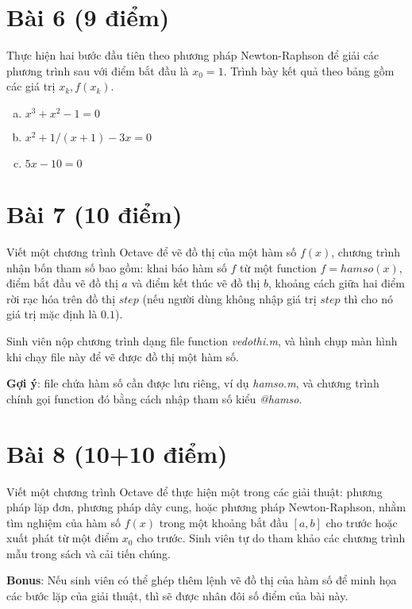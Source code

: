\documentclass[12pt]{article}
\begin{document}
\section{Bài 6 (9 điểm)}
Thực hiện hai bước đầu tiên theo phương pháp Newton-Raphson để giải các phương trình sau với điểm bắt đầu là $x_0 = 1$. Trình bày kết quả theo bảng gồm các giá trị $x_k, f(x_k)$.

\begin{enumerate}[a)]

\item $x^3 + x^2 - 1 = 0$

\item $x^2 + 1/(x+1) - 3x = 0$

\item $5x - 10 = 0$

\end{enumerate}

\section{Bài 7 (10 điểm)}
Viết một chương trình Octave để vẽ đồ thị của một hàm số $f(x)$, chương trình nhận bốn tham số bao gồm: khai báo hàm số $f$ từ một function $f=hamso(x)$, điểm bắt đầu vẽ đồ thị $a$ và điểm kết thúc vẽ đồ thị $b$, khoảng cách giữa hai điểm rời rạc hóa trên đồ thị $step$ (nếu người dùng không nhập giá trị $step$ thì cho nó giá trị mặc định là $0.1$).

Sinh viên nộp chương trình dạng file function \emph{vedothi.m}, và hình chụp màn hình khi chạy file này để vẽ được đồ thị một hàm số.

\textbf{Gợi ý}: file chứa hàm số cần được lưu riêng, ví dụ \emph{hamso.m}, và chương trình chính gọi function đó bằng cách nhập tham số kiểu \emph{@hamso}.

\section{Bài 8 (10+10 điểm)}
Viết một chương trình Octave để thực hiện một trong các giải thuật: phương pháp lặp đơn, phương pháp dây cung, hoặc phương pháp Newton-Raphson, nhằm tìm nghiệm của hàm số $f(x)$ trong một khoảng bắt đầu $[a,b]$ cho trước hoặc xuất phát từ một điểm $x_0$ cho trước. Sinh viên tự do tham khảo các chương trình mẫu trong sách và cải tiến chúng.

\textbf{Bonus}: Nếu sinh viên có thể ghép thêm lệnh vẽ đồ thị của hàm số để minh họa các bước lặp của giải thuật, thì sẽ được nhân đôi số điểm của bài này.
\end{document}
